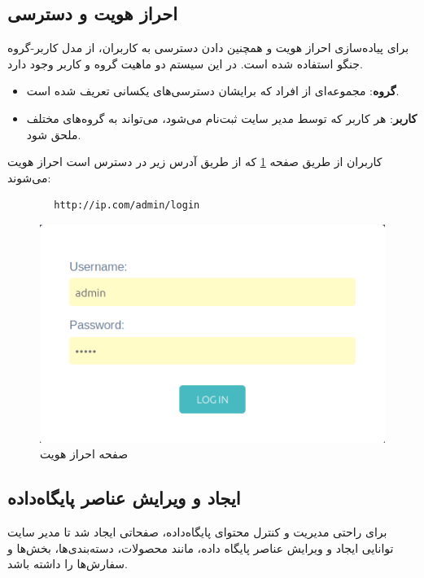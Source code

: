 \subsection{احراز هویت و دسترسی}
برای پیاده‌سازی احراز هویت و همچنین دادن دسترسی به کاربران، از مدل کاربر-گروه جنگو استفاده شده است.
در این سیستم دو ماهیت گروه و کاربر وجود دارد.
\begin{itemize}
   	\item \textbf{گروه}: مجموعه‌ای از افراد که برایشان دسترسی‌های یکسانی تعریف شده است.
   	\item \textbf{کاربر}: هر کاربر که توسط مدیر سایت ثبت‌نام می‌شود، می‌تواند به گروه‌های مختلف ملحق شود.
\end{itemize}
کاربران از طریق صفحه \ref{login} که از طریق آدرس زیر در دسترس است احراز هویت می‌شوند:
\begin{latin}
    \begin{lstlisting}
        http://ip.com/admin/login
    \end{lstlisting}
\end{latin}

\begin{figure}[t!]
    \centering
    \includegraphics[scale=0.5]{figures/login.png}
    \caption{صفحه احراز هویت }
    \label{login}
\end{figure}



\subsection{ایجاد و ویرایش عناصر پایگاه‌داده}
برای راحتی مدیریت و کنترل محتوای پایگاه‌داده، صفحاتی ایجاد شد تا مدیر سایت توانایی ایجاد و ویرایش عناصر پایگاه داده، مانند محصولات، دسته‌بندی‌ها، بخش‌ها و سفارش‌ها را داشته باشد.

